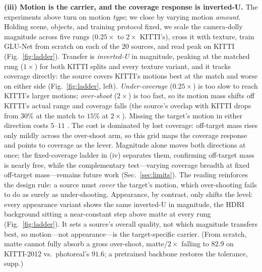 \noindent\textbf{(iii) Motion is the carrier, and the coverage response is
inverted-U.} The experiments above turn on motion \emph{type}; we close by varying
motion \emph{amount}. Holding scene, objects, and training protocol fixed, we
scale the camera-dolly magnitude across five rungs ($0.25\times$ to $2\times$
KITTI's), cross it with texture, train GLU-Net from scratch on each of the $20$
sources, and read peak \pck{} on KITTI (Fig.~\ref{fig:ladder}). Transfer is
\emph{inverted-U} in magnitude, peaking at the matched rung ($1\times$) for both
KITTI splits and every texture variant, and it tracks coverage directly: the source
covers KITTI's motions best at the match and worse on either side
(Fig.~\ref{fig:ladder}, left).
\emph{Under-coverage} ($0.25\times$) is too slow to reach KITTI's larger motions;
\emph{over-shoot} ($2\times$) is too fast, so its motion mass shifts off KITTI's
actual range and coverage falls (the source's overlap with KITTI drops from
$30\%$ at the match to $15\%$ at $2\times$). Missing the target's motion in either
direction costs $5$--$11$ \pck. The cost is dominated by lost coverage: off-target
mass rises only mildly across the over-shoot arm, so this grid maps the coverage
response and points to coverage as the lever. Magnitude alone moves both directions
at once; the fixed-coverage ladder in (iv) separates them, confirming off-target
mass is nearly free, while the complementary test---varying coverage breadth at
fixed off-target mass---remains future work (Sec.~\ref{sec:limits}). The reading reinforces the design rule: a source must
\emph{cover} the target's motion, which over-shooting fails to do as surely as
under-shooting. Appearance, by contrast, only shifts the level: every appearance
variant shows the same inverted-U in magnitude, the HDRI background sitting a
near-constant step above matte at every rung (Fig.~\ref{fig:ladder}). It sets a
source's overall quality, not which magnitude transfers best, so motion---not
appearance---is the target-specific carrier. (From scratch, matte cannot fully
absorb a gross over-shoot, matte/$2\times$ falling to $82.9$ on KITTI-2012 vs.\
photoreal's $91.6$; a pretrained backbone restores the tolerance, supp.)


